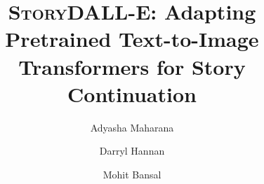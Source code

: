 \documentclass[runningheads]{llncs}
\newcommand{\sdalle}[1]{\textsc{StoryDALL-E}}
\begin{document}
\pagestyle{headings}
\mainmatter
\def\ECCVSubNumber{8009}  

\title{\sdalle{}: Adapting Pretrained Text-to-Image Transformers for Story Continuation} 






\author{Adyasha Maharana \and
Darryl Hannan \and
Mohit Bansal}

\maketitle

\begin{abstract}

\end{abstract}
\end{document}
